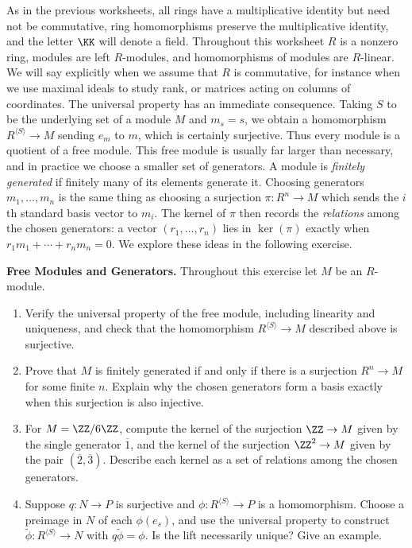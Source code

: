 \documentclass[12pt,reqno]{amsart}
\begin{document}
As in the previous worksheets, all rings have a multiplicative identity but need not be commutative, ring homomorphisms preserve the multiplicative identity, and the letter $\KK$ will denote a field. Throughout this worksheet $R$ is a nonzero ring, modules are left $R$-modules, and homomorphisms of modules are $R$-linear. We will say explicitly when we assume that $R$ is commutative, for instance when we use maximal ideals to study rank, or matrices acting on columns of coordinates. The universal property has an immediate consequence. Taking $S$ to be the underlying set of a module $M$ and $m_s=s$, we obtain a homomorphism $R^{\langle S\rangle}\to M$ sending $e_m$ to $m$, which is certainly surjective. Thus every module is a quotient of a free module. This free module is usually far larger than necessary, and in practice we choose a smaller set of generators. A module is \emph{finitely generated} if finitely many of its elements generate it. Choosing generators $m_1,\ldots,m_n$ is the same thing as choosing a surjection $\pi:R^n\to M$ which sends the $i$th standard basis vector to $m_i$. The kernel of $\pi$ then records the \emph{relations} among the chosen generators: a vector $(r_1,\ldots,r_n)$ lies in $\ker(\pi)$ exactly when $r_1m_1+\cdots+r_nm_n=0$. We explore these ideas in the following exercise.

\hrulefill

\begin{problems}
\item\label{p:free} \textbf{Free Modules and Generators.} Throughout this exercise let $M$ be an $R$-module.
\begin{enumerate}
\item Verify the universal property of the free module, including linearity and uniqueness, and check that the homomorphism $R^{\langle S\rangle}\to M$ described above is surjective.
\item Prove that $M$ is finitely generated if and only if there is a surjection $R^n\to M$ for some finite $n$. Explain why the chosen generators form a basis exactly when this surjection is also injective.
\item For $M=\ZZ/6\ZZ$, compute the kernel of the surjection $\ZZ\to M$ given by the single generator $\overline1$, and the kernel of the surjection $\ZZ^2\to M$ given by the pair $(\overline2,\overline3)$. Describe each kernel as a set of relations among the chosen generators.
\item Suppose $q:N\to P$ is surjective and $\phi:R^{\langle S\rangle}\to P$ is a homomorphism. Choose a preimage in $N$ of each $\phi(e_s)$, and use the universal property to construct $\widetilde\phi:R^{\langle S\rangle}\to N$ with $q\widetilde\phi=\phi$. Is the lift necessarily unique? Give an example.
\end{enumerate}
\end{problems}
\end{document}

